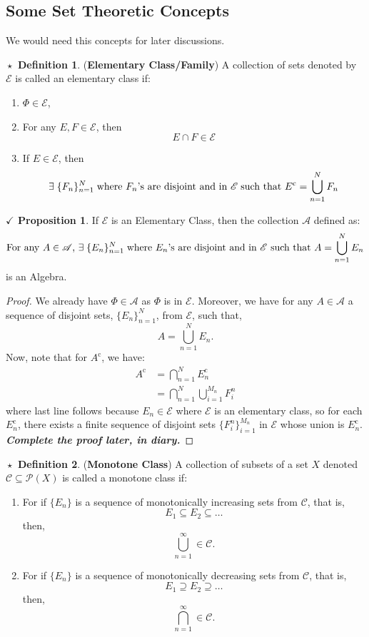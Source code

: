 \documentclass{article}
\theoremstyle{definition}
\newtheorem{definition}{$\boxed{\star}$ Definition}
\theoremstyle{remark}
\theoremstyle{definition}
\theoremstyle{definition}
\newtheorem{proposition}{$\checkmark$ Proposition}
\theoremstyle{definition}
\newcommand{\intrs}{\cap}
\newcommand{\bunion}{\bigcup}
\newcommand{\bintrs}{\bigcap}
\newcommand{\alg}[1]{\mathscr{#1}}
\newcommand{\comp}[1]{#1^{\text{c}}}
\newcommand{\pow}[1]{\mathscr{P}\left (#1\right )}
\begin{document}
\subsection{Some Set Theoretic Concepts}
We would need this concepts for later discussions.
\begin{definition}
	(\textbf{Elementary Class/Family}) A collection of sets denoted by $ \alg{E} $ is called an elementary class if:
	\begin{enumerate}
		\item {$ \Phi \in \alg{E} $,}
		\item {For any $ E,F \in \alg{E} $, then 
	\[E\intrs F \in \alg{E}\]	
	}
\item {If $ E\in \alg{E} $, then
\[\exists\; \{F_n\}_{n=1}^{N} \;\text{where $ F_n $'s are disjoint and in $ \alg{E} $}\;\text{such that } \comp{E} = \bunion_{n=1}^{N} F_n\]
}
	\end{enumerate}
\end{definition}
\hrulefill
\begin{proposition}\label{P-40}
	If $ \alg{E} $ is an Elementary Class, then the collection $ \alg{A} $ defined as:
	\[\text{For any $ A \in \alg{A} $, }\exists \;\{E_n\}_{n=1}^{N} \;\text{where $ E_n $'s are disjoint and in $\alg{E}  $ such that } A = \bunion_{n=1}^{N} E_n\]
	is an Algebra.
\end{proposition}
\begin{proof}
	We already have $ \Phi \in \alg{A} $ as $ \Phi $ is in $ \alg{E} $. Moreover, we have for any $ A\in \alg{A} $ a sequence of disjoint sets, $ \{E_n\}_{n=1}^{N} $, from $ \alg{E} $, such that,
	\[A = \bunion_{n=1}^{N} E_n.\]
	Now, note that for $ \comp{A} $, we have:
	\begin{align*}
		\comp{A} &= \bintrs_{n=1}^{N} \comp{E_n}\\
		&= \bintrs_{n=1}^{N} \bunion_{i=1}^{M_n} F_i^{n} 
	\end{align*} 
where last line follows because $ E_n \in \alg{E} $ where $ \alg{E} $ is an elementary class, so for each $ \comp{E_n} $, there exists a finite sequence of disjoint sets $ \{F^{n}_i\}_{i=1}^{M_n} $ in $ \alg{E} $  whose union is $ \comp{E_n} $. \textbf{\emph{Complete the proof later, in diary.}}
\end{proof}
\hrulefill
\begin{definition}
	(\textbf{Monotone Class}) A collection of subsets of a set $ X $ denoted $ \alg{C} \subseteq \pow{X}$ is called a monotone class if:
	\begin{enumerate}
		\item {For if $ \{E_n \} $ is a sequence of monotonically increasing sets from $ \alg{C} $, that is,
	\[E_1\subseteq E_2 \subseteq \dots \]	
	then,
\[\bunion_{n=1}^{\infty} \in \alg{C}.\]
 }
\item {For if $ \{E_n \} $ is a sequence of monotonically decreasing sets from $ \alg{C} $, that is,
	\[E_1\supseteq E_2 \supseteq \dots \]	
	then,
	\[\bintrs_{n=1}^{\infty} \in \alg{C}.\]}
	\end{enumerate}
\end{definition}
\end{document}
